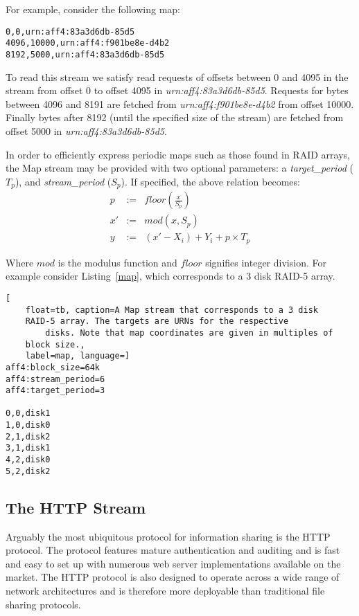 \documentclass[10pt, conference]{IEEEtran}
\begin{document}
For example, consider the following map:
\begin{lstlisting}
0,0,urn:aff4:83a3d6db-85d5
4096,10000,urn:aff4:f901be8e-d4b2
8192,5000,urn:aff4:83a3d6db-85d5
\end{lstlisting}

To read this stream we satisfy read requests of offsets between 0 and
4095 in the stream from offset 0 to offset 4095 in
\emph{urn:aff4:83a3d6db-85d5}. Requests for bytes between 4096 and 8191 are
fetched from \emph{urn:aff4:f901be8e-d4b2} from offset 10000. Finally
bytes after 8192 (until the specified size of the stream) are fetched
from offset 5000 in \emph{urn:aff4:83a3d6db-85d5}.

In order to efficiently express periodic maps such as those found in
RAID arrays, the Map stream may be provided with two optional
parameters: a {\em target\_period} ($T_p$), and {\em stream\_period}
($S_p$). If specified, the above relation becomes:
\begin{eqnarray*}
p &:=& floor\left (\frac{x}{S_p} \right) \\
x' &:=& mod(x ,S_p)  \\   \label{eq:no1}
y &:=& (x'-X_i) + Y_i + p \times T_p
\end{eqnarray*}

Where $mod$ is the modulus function and $floor$ signifies integer
division. For example consider Listing~\ref{map}, which corresponds to a 3
disk RAID-5 array.

\begin{lstlisting}[
	float=tb, caption=A Map stream that corresponds to a 3 disk
	RAID-5 array. The targets are URNs for the respective
        disks. Note that map coordinates are given in multiples of 
	block size.,
	label=map, language=]
aff4:block_size=64k 
aff4:stream_period=6 
aff4:target_period=3

0,0,disk1
1,0,disk0
2,1,disk2
3,1,disk1
4,2,disk0
5,2,disk2
\end{lstlisting}

\subsection{The HTTP Stream}
Arguably the most ubiquitous protocol for information sharing is the
HTTP protocol\cite{HTTP_RFC}. The protocol features mature
authentication and auditing and is fast and easy to set up with
numerous web server implementations available on the market. The HTTP
protocol is also designed to operate across a wide range of network
architectures and is therefore more deployable than traditional file
sharing protocols.
\end{document}
